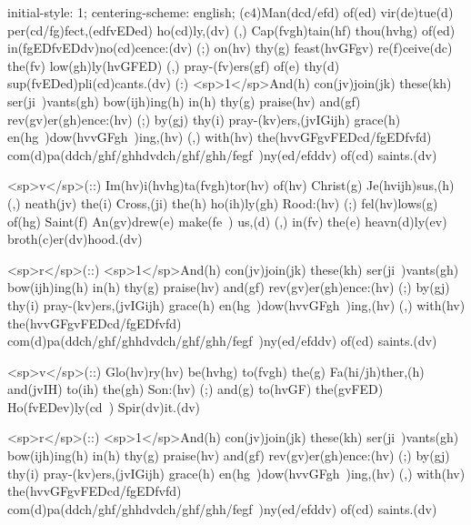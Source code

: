 initial-style: 1;
centering-scheme: english;
(c4)Man(dcd/efd) of(ed) vir(de)tue(d) per(cd/fg)fect,(edfvEDed) ho(cd)ly,(dv) (,) Cap(fvgh)tain(hf) thou(hvhg) of(ed) in(fgEDfvEDdv)no(cd)cence:(dv) (;) on(hv) thy(g) feast(hvGFgv) re(f)ceive(dc) the(fv) low(gh)ly(hvGFED) (,) pray-(fv)ers(gf) of(e) thy(d) sup(fvEDed)pli(cd)cants.(dv) (:) <sp>1</sp>And(h) con(jv)join(jk) these(kh) ser(ji~)vants(gh) bow(ijh)ing(h) in(h) thy(g) praise(hv) and(gf) rev(gv)er(gh)ence:(hv) (;) by(gj) thy(i) pray-(kv)ers,(jvIGijh) grace(h) en(hg~)dow(hvvGFgh~)ing,(hv) (,) with(hv) the(hvvGFgvFEDcd/fgEDfvfd) com(d)pa(ddch/ghf/ghhdvdch/ghf/ghh/fegf~)ny(ed/efddv) of(cd) saints.(dv)

<sp>v</sp>(::) Im(hv)i(hvhg)ta(fvgh)tor(hv) of(hv) Christ(g) Je(hvijh)sus,(h) (,) neath(jv) the(i) Cross,(ji) the(h) ho(ih)ly(gh) Rood:(hv) (;) fel(hv)lows(g) of(hg) Saint(f) An(gv)drew(e) make(fe~) us,(d) (,) in(fv) the(e) heavn(d)ly(ev) broth(c)er(dv)hood.(dv)

<sp>r</sp>(::) <sp>1</sp>And(h) con(jv)join(jk) these(kh) ser(ji~)vants(gh) bow(ijh)ing(h) in(h) thy(g) praise(hv) and(gf) rev(gv)er(gh)ence:(hv) (;) by(gj) thy(i) pray-(kv)ers,(jvIGijh) grace(h) en(hg~)dow(hvvGFgh~)ing,(hv) (,) with(hv) the(hvvGFgvFEDcd/fgEDfvfd) com(d)pa(ddch/ghf/ghhdvdch/ghf/ghh/fegf~)ny(ed/efddv) of(cd) saints.(dv)

<sp>v</sp>(::) Glo(hv)ry(hv) be(hvhg) to(fvgh) the(g) Fa(hi/jh)ther,(h) and(jvIH) to(ih) the(gh) Son:(hv) (;) and(g) to(hvGF) the(gvFED) Ho(fvEDev)ly(cd~) Spir(dv)it.(dv)

<sp>r</sp>(::) <sp>1</sp>And(h) con(jv)join(jk) these(kh) ser(ji~)vants(gh) bow(ijh)ing(h) in(h) thy(g) praise(hv) and(gf) rev(gv)er(gh)ence:(hv) (;) by(gj) thy(i) pray-(kv)ers,(jvIGijh) grace(h) en(hg~)dow(hvvGFgh~)ing,(hv) (,) with(hv) the(hvvGFgvFEDcd/fgEDfvfd) com(d)pa(ddch/ghf/ghhdvdch/ghf/ghh/fegf~)ny(ed/efddv) of(cd) saints.(dv)